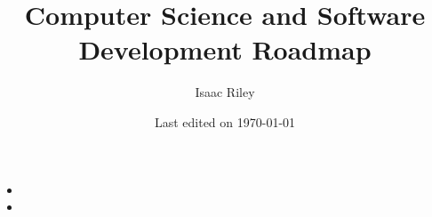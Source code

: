 \documentclass[a4, 12pt]{article}
\title{Computer Science and Software Development Roadmap}
\author{Isaac Riley}
\date{Last edited on \today}
\begin{document}
\maketitle
\begin{itemize}
    \item 
    \item 
\end{itemize}
\end{document}
